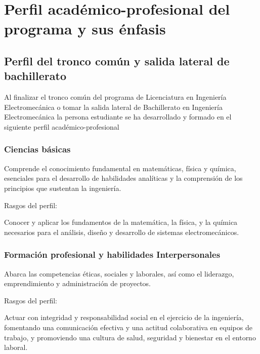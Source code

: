 \section*{Perfil académico-profesional del programa y sus énfasis}

\subsection*{Perfil del tronco común y salida lateral de bachillerato}

Al finalizar el tronco común del programa de Licenciatura en Ingeniería Electromecánica o tomar la salida lateral de Bachillerato en Ingeniería Electromecánica la persona estudiante se ha desarrollado y formado en el siguiente perfil académico-profesional\par

\subsubsection*{Ciencias básicas}

Comprende el conocimiento fundamental en matemáticas, física y química, esenciales para el desarrollo de habilidades analíticas y la comprensión de los principios que sustentan la ingeniería.\par

Rasgos del perfil:\par

\begin{cuadroazul}[CIB01]
Conocer y aplicar los fundamentos de la matemática, la física, y la química necesarios para el análisis, diseño y desarrollo de sistemas electromecánicos.
\end{cuadroazul}

\subsubsection*{Formación profesional y habilidades Interpersonales}

Abarca las competencias éticas, sociales y laborales, así como el liderazgo, emprendimiento y administración de proyectos.\par

Rasgos del perfil:\par

\begin{cuadroazul}[FPH01]
Actuar con integridad y responsabilidad social en el ejercicio de la ingeniería, fomentando una comunicación efectiva y una actitud colaborativa en equipos de trabajo, y promoviendo una cultura de salud, seguridad y bienestar en el entorno laboral.
\end{cuadroazul}

